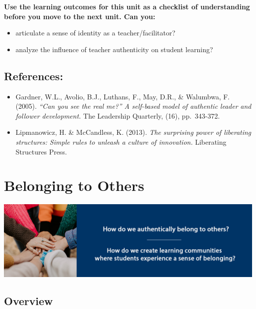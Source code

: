 \documentclass[
]{book}
\providecommand{\tightlist}{%
  \setlength{\itemsep}{0pt}\setlength{\parskip}{0pt}}
\begin{document}
\begin{progress}
\textbf{Use the learning outcomes for this unit as a checklist of
understanding before you move to the next unit. Can you:}

\begin{itemize}
\tightlist
\item
  articulate a sense of identity as a teacher/facilitator?
\item
  analyze the influence of teacher authenticity on student learning?
\end{itemize}
\end{progress}

\hypertarget{references}{%
\section*{References:}\label{references}}

\begin{itemize}
\tightlist
\item
  Gardner, W.L., Avolio, B.J., Luthans, F., May, D.R., \& Walumbwa, F. (2005). \emph{``Can you see the real me?'' A self-based model of authentic leader and follower development.} The Leadership Quarterly, (16), pp.~343-372.\\
\item
  Lipmanowicz, H. \& McCandless, K. (2013). \emph{The surprising power of liberating structures: Simple rules to unleash a culture of innovation.} Liberating Structures Press.
\end{itemize}

\hypertarget{belonging-to-others}{%
\chapter{Belonging to Others}\label{belonging-to-others}}

\includegraphics{assets/unit3/LDRS664-BannerUnit3.jpg}

\hypertarget{overview-2}{%
\section*{Overview}\label{overview-2}}
\end{document}
